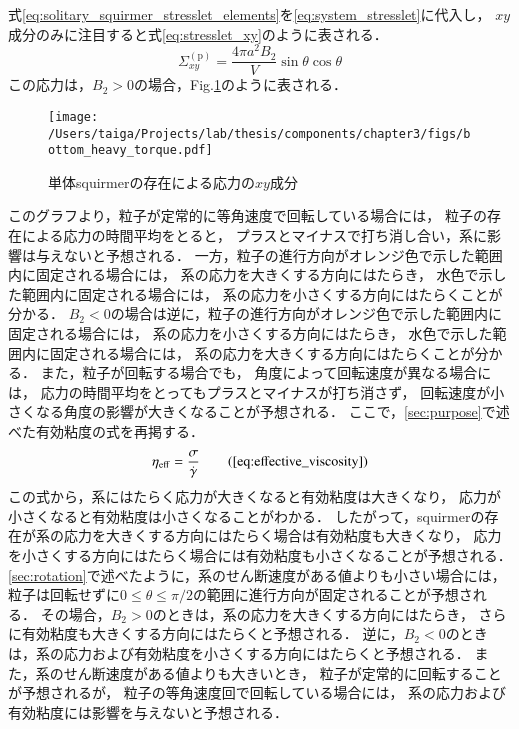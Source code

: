 式\eqref{eq:solitary_squirmer_stresslet_elements}を\eqref{eq:system_stresslet}に代入し，
$xy$成分のみに注目すると式\eqref{eq:stresslet_xy}のように表される．
    \begin{equation}
        \Sigma^\mathrm{(p)}_{xy} = \frac{4 \pi a^2 B_2}{V} \sin{\theta} \cos{\theta}
        \label{eq:stresslet_xy}
    \end{equation}
この応力は，$B_2 > 0$の場合，Fig.\ref{fig:stresslet_xy}のように表される．
    \begin{figure}[H]
        \centering
        \texttt{[image: /Users/taiga/Projects/lab/thesis/components/chapter3/figs/bottom\_heavy\_torque.pdf]}
        \caption{単体squirmerの存在による応力の$xy$成分}
        \label{fig:stresslet_xy}
    \end{figure}
\noindent
このグラフより，粒子が定常的に等角速度で回転している場合には，
粒子の存在による応力の時間平均をとると，
プラスとマイナスで打ち消し合い，系に影響は与えないと予想される．
一方，粒子の進行方向がオレンジ色で示した範囲内に固定される場合には，
系の応力を大きくする方向にはたらき，
水色で示した範囲内に固定される場合には，
系の応力を小さくする方向にはたらくことが分かる．
$B_2<0$の場合は逆に，粒子の進行方向がオレンジ色で示した範囲内に固定される場合には，
系の応力を小さくする方向にはたらき，
水色で示した範囲内に固定される場合には，
系の応力を大きくする方向にはたらくことが分かる．
また，粒子が回転する場合でも，
角度によって回転速度が異なる場合には，
応力の時間平均をとってもプラスとマイナスが打ち消さず，
回転速度が小さくなる角度の影響が大きくなることが予想される．
ここで，\ref{sec:purpose}で述べた有効粘度の式を再掲する．
    \begin{equation}
        \eta_\mathrm{eff} = \frac{\sigma}{\dot{\gamma}}
        \tag{\ref{eq:effective_viscosity}}
    \end{equation}
この式から，系にはたらく応力が大きくなると有効粘度は大きくなり，
応力が小さくなると有効粘度は小さくなることがわかる．
したがって，squirmerの存在が系の応力を大きくする方向にはたらく場合は有効粘度も大きくなり，
応力を小さくする方向にはたらく場合には有効粘度も小さくなることが予想される．
\ref{sec:rotation}で述べたように，系のせん断速度がある値よりも小さい場合には，
粒子は回転せずに$0 \leq \theta \leq \pi / 2$の範囲に進行方向が固定されることが予想される．
その場合，$B_2 > 0$のときは，系の応力を大きくする方向にはたらき，
さらに有効粘度も大きくする方向にはたらくと予想される．
逆に，$B_2 < 0$のときは，系の応力および有効粘度を小さくする方向にはたらくと予想される．
また，系のせん断速度がある値よりも大きいとき，
粒子が定常的に回転することが予想されるが，
粒子の等角速度回で回転している場合には，
系の応力および有効粘度には影響を与えないと予想される．
